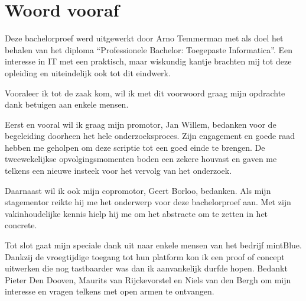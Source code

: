 
\chapter*{Woord vooraf}
\label{ch:voorwoord}

Deze bachelorproef werd uitgewerkt door Arno Temmerman met als doel het behalen van het diploma ``Professionele Bachelor: Toegepaste Informatica''. Een interesse in IT met een praktisch, maar wiskundig kantje brachten mij tot deze opleiding en uiteindelijk ook tot dit eindwerk.

Vooraleer ik tot de zaak kom, wil ik met dit voorwoord graag mijn opdrachte dank betuigen aan enkele mensen.

Eerst en vooral wil ik graag mijn promotor, Jan Willem, bedanken voor de begeleiding doorheen het hele onderzoeksproces. Zijn engagement en goede raad hebben me geholpen om deze scriptie tot een goed einde te brengen. De tweewekelijkse opvolgingsmomenten boden een zekere houvast en gaven me telkens een nieuwe insteek voor het vervolg van het onderzoek.

Daarnaast wil ik ook mijn copromotor, Geert Borloo, bedanken. Als mijn stagementor reikte hij me het onderwerp voor deze bachelorproef aan. Met zijn vakinhoudelijke kennis hielp hij me om het abstracte om te zetten in het concrete.

Tot slot gaat mijn speciale dank uit naar enkele mensen van het bedrijf mintBlue. Dankzij de vroegtijdige toegang tot hun platform kon ik een proof of concept uitwerken die nog tastbaarder was dan ik aanvankelijk durfde hopen. Bedankt Pieter Den Dooven, \mbox{Maurits} van Rijckevorstel en Niels van den Bergh om mijn interesse en vragen telkens met open armen te ontvangen.